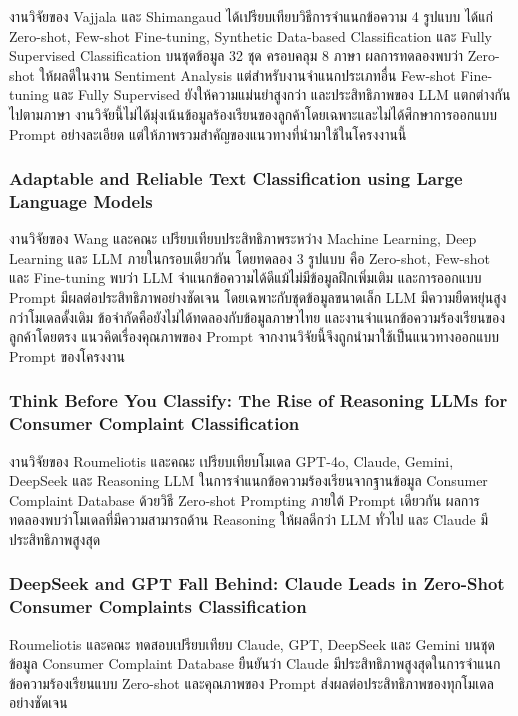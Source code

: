 งานวิจัยของ Vajjala และ Shimangaud \cite{vajjala2024} ได้เปรียบเทียบวิธีการจำแนกข้อความ 4 รูปแบบ ได้แก่ Zero-shot, Few-shot Fine-tuning, Synthetic Data-based Classification และ Fully Supervised Classification บนชุดข้อมูล 32 ชุด ครอบคลุม 8 ภาษา ผลการทดลองพบว่า Zero-shot ให้ผลดีในงาน Sentiment Analysis แต่สำหรับงานจำแนกประเภทอื่น Few-shot Fine-tuning และ Fully Supervised ยังให้ความแม่นยำสูงกว่า และประสิทธิภาพของ LLM แตกต่างกันไปตามภาษา งานวิจัยนี้ไม่ได้มุ่งเน้นข้อมูลร้องเรียนของลูกค้าโดยเฉพาะและไม่ได้ศึกษาการออกแบบ Prompt อย่างละเอียด แต่ให้ภาพรวมสำคัญของแนวทางที่นำมาใช้ในโครงงานนี้

\subsubsection{Adaptable and Reliable Text Classification using Large Language Models \cite{wang2023adaptable}}

งานวิจัยของ Wang และคณะ \cite{wang2023adaptable} เปรียบเทียบประสิทธิภาพระหว่าง Machine Learning, Deep Learning และ LLM ภายในกรอบเดียวกัน โดยทดลอง 3 รูปแบบ คือ Zero-shot, Few-shot และ Fine-tuning พบว่า LLM จำแนกข้อความได้ดีแม้ไม่มีข้อมูลฝึกเพิ่มเติม และการออกแบบ Prompt มีผลต่อประสิทธิภาพอย่างชัดเจน โดยเฉพาะกับชุดข้อมูลขนาดเล็ก LLM มีความยืดหยุ่นสูงกว่าโมเดลดั้งเดิม ข้อจำกัดคือยังไม่ได้ทดลองกับข้อมูลภาษาไทย และงานจำแนกข้อความร้องเรียนของลูกค้าโดยตรง แนวคิดเรื่องคุณภาพของ Prompt จากงานวิจัยนี้จึงถูกนำมาใช้เป็นแนวทางออกแบบ Prompt ของโครงงาน

\subsubsection{Think Before You Classify: The Rise of Reasoning LLMs for Consumer Complaint Classification \cite{roumeliotis2025think}}

งานวิจัยของ Roumeliotis และคณะ \cite{roumeliotis2025think} เปรียบเทียบโมเดล GPT-4o, Claude, Gemini, DeepSeek และ Reasoning LLM ในการจำแนกข้อความร้องเรียนจากฐานข้อมูล Consumer Complaint Database ด้วยวิธี Zero-shot Prompting ภายใต้ Prompt เดียวกัน ผลการทดลองพบว่าโมเดลที่มีความสามารถด้าน Reasoning ให้ผลดีกว่า LLM ทั่วไป และ Claude มีประสิทธิภาพสูงสุด

\subsubsection{DeepSeek and GPT Fall Behind: Claude Leads in Zero-Shot Consumer Complaints Classification \cite{roumeliotis2025deepseek}}

Roumeliotis และคณะ \cite{roumeliotis2025deepseek} ทดสอบเปรียบเทียบ Claude, GPT, DeepSeek และ Gemini บนชุดข้อมูล Consumer Complaint Database ยืนยันว่า Claude มีประสิทธิภาพสูงสุดในการจำแนกข้อความร้องเรียนแบบ Zero-shot และคุณภาพของ Prompt ส่งผลต่อประสิทธิภาพของทุกโมเดลอย่างชัดเจน

